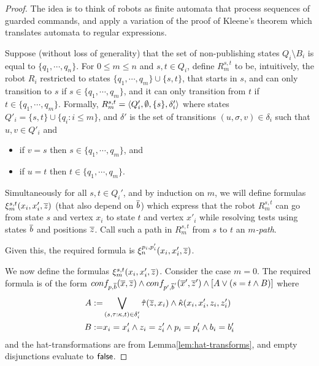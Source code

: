 \begin{proof}
The idea is to think of robots as finite automata that process sequences of guarded commands, and apply a variation of the proof of Kleene's theorem which translates automata to regular expressions. 



Suppose (without loss of generality) that the set of non-publishing states $Q_i \setminus B_i$ is equal to $\{q_1, \cdots, q_n\}$.
For $0 \leq m \leq n$ 
and $s,t \in Q_i$, define $R_m^{s,t}$ to be, intuitively, the robot $R_i$ restricted to states $\{q_1, \cdots, q_m\} \cup \{s,t\}$, that starts in $s$, and can only transition to 
$s$ if $s \in \{q_1, \cdots, q_m\}$, and it can only transition from $t$ if $t \in \{q_1, \cdots, q_m\}$. Formally, $R_m^{s,t} = \langle {Q'_i,\emptyset,\{s\},\delta'_i} \rangle$ 
where states $Q'_i = \{s,t\} \cup \{q_i : i \leq m\}$, and $\delta'$ is the set of transitions $(u,\sigma,v) \in \delta_i$ such that $u,v \in Q'_i$ and
\begin{itemize} 
 \item if $v = s$ then $s \in \{q_1, \cdots, q_m\}$, and
 \item if $u = t$ then $t \in \{q_1, \cdots, q_m\}$.
\end{itemize}

Simultaneously for all $s,t \in Q_i'$, and by induction on $m$, we will define formulas $\xi_m^{s,t}(x_i,x'_i,\overline{z})$ (that also depend on $\overline{b}$) 
which express that the robot $R_m^{s,t}$ can go from state $s$ and vertex $x_i$ to state $t$ and vertex $x'_i$ while resolving tests using states $\overline{b}$ and positions $\overline{z}$. 
Call such a path in $R_m^{s,t}$ from $s$ to $t$ an \emph{$m$-path}. 

Given this, the required formula is $\xi_n^{p_i,p'_i}(x_i,x'_i,\overline{z})$. 



We now define the formulas $\xi_m^{s,t}(x_i,x'_i,\overline{z})$. Consider the case $m = 0$. The required formula is of the form $conf_{p,\overline{b}}(\overline{x},\overline{z}) \wedge 
conf_{p',\overline{b}'}(\overline{x}',\overline{z}') \wedge [A \vee (s = t \wedge B)]$ where
 \begin{eqnarray*}
A  := & \bigvee_{(s,\tau:\kappa,t) \in \delta'_i} \hat{\tau}(\overline{z},x_i) \wedge \hat{\kappa}(x_i,x'_i,z_i,z'_i)\\
B  :=  & x_i = x'_i \wedge z_i = z'_i \wedge p_i = p'_i \wedge b_i = b'_i
\end{eqnarray*}
and the hat-transformations are from Lemma\ref{lem:hat-transforms}, and empty disjunctions evaluate to $\mathsf{false}$.
 

\end{proof}
